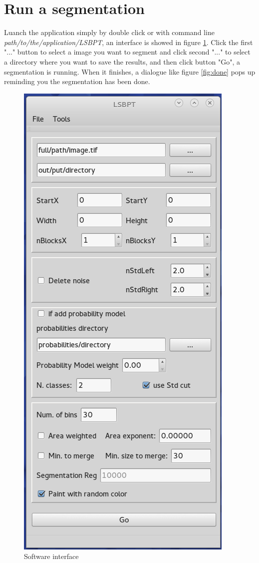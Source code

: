 \documentclass[10pt,a4paper]{article}
\begin{document}
\section{Run a segmentation}
Luanch the application simply by double click or with command line \\
\textit{path/to/the/application/LSBPT}, an interface is showed in figure \ref{fig:interface}. Click the first "..." button to select a image you want to segment and click second "..." to select a directory where you want to save the results, and then click  button "Go", a segmentation is running. When it finishes, a dialogue like figure \ref{fig:done} pops up reminding you the segmentation has been done.

\begin{figure}
\centering
	\includegraphics[scale=0.6]{figs/interface.png}
\caption{Software interface}
 \label{fig:interface}
\end{figure}
\end{document}
